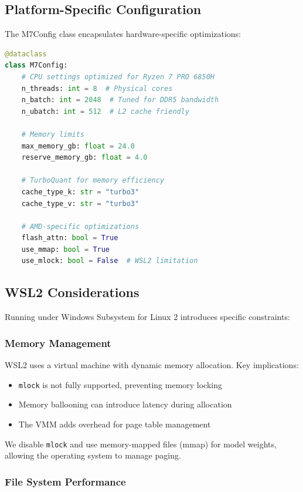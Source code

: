 \subsection{Platform-Specific Configuration}

The M7Config class encapsulates hardware-specific optimizations:

\begin{lstlisting}[language=Python, caption=M7Config Hardware-Specific Settings]
@dataclass
class M7Config:
    # CPU settings optimized for Ryzen 7 PRO 6850H
    n_threads: int = 8  # Physical cores
    n_batch: int = 2048  # Tuned for DDR5 bandwidth
    n_ubatch: int = 512  # L2 cache friendly
    
    # Memory limits
    max_memory_gb: float = 24.0
    reserve_memory_gb: float = 4.0
    
    # TurboQuant for memory efficiency
    cache_type_k: str = "turbo3"
    cache_type_v: str = "turbo3"
    
    # AMD-specific optimizations
    flash_attn: bool = True
    use_mmap: bool = True
    use_mlock: bool = False  # WSL2 limitation
\end{lstlisting}

\subsection{WSL2 Considerations}

Running under Windows Subsystem for Linux 2 introduces specific constraints:

\subsubsection{Memory Management}

WSL2 uses a virtual machine with dynamic memory allocation. Key implications:

\begin{itemize}
    \item \texttt{mlock} is not fully supported, preventing memory locking
    \item Memory ballooning can introduce latency during allocation
    \item The VMM adds overhead for page table management
\end{itemize}

We disable \texttt{mlock} and use memory-mapped files (mmap) for model weights, allowing the operating system to manage paging.

\subsubsection{File System Performance}


